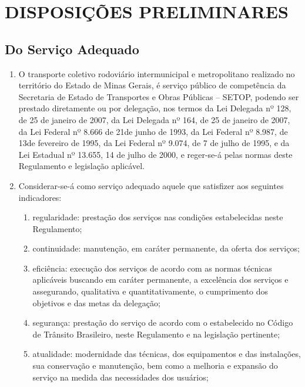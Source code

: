 \chapter{DISPOSIÇÕES PRELIMINARES}

\section{Do Serviço Adequado}

\begin{enumerate}[label=Art. \arabic*]
\item O transporte coletivo rodoviário intermunicipal e metropolitano realizado no território do Estado de Minas Gerais, é serviço público de competência da Secretaria de Estado de Transportes e Obras Públicas – SETOP, podendo ser prestado diretamente ou por delegação, nos termos da Lei Delegada nº 128, de 25 de janeiro de 2007, da Lei Delegada nº 164, de 25 de janeiro de 2007, da Lei Federal nº 8.666 de 21de junho de 1993, da Lei Federal nº 8.987, de 13de fevereiro de 1995, da Lei Federal nº 9.074, de 7 de julho de 1995, e da Lei Estadual nº 13.655, 14 de julho de 2000, e reger-se-á pelas normas deste Regulamento e legislação aplicável.

\item Considerar-se-á como serviço adequado aquele que satisfizer aos seguintes indicadores:

\begin{enumerate}[label=\roman*.]

\item regularidade: prestação dos serviços nas condições estabelecidas neste Regulamento;

\item continuidade: manutenção, em caráter permanente, da oferta dos serviços;

\item eficiência: execução dos serviços de acordo com as normas técnicas aplicáveis buscando em caráter permanente, a excelência dos serviços e assegurando, qualitativa e quantitativamente, o cumprimento dos objetivos e das metas da delegação;

\item  segurança: prestação do serviço de acordo com o estabelecido no Código de Trânsito Brasileiro, neste Regulamento e na legislação pertinente;

\item atualidade: modernidade das técnicas, dos equipamentos e das instalações, sua conservação e manutenção, bem como a melhoria e expansão do serviço na medida das necessidades dos usuários;


\end{enumerate}
\end{enumerate}
